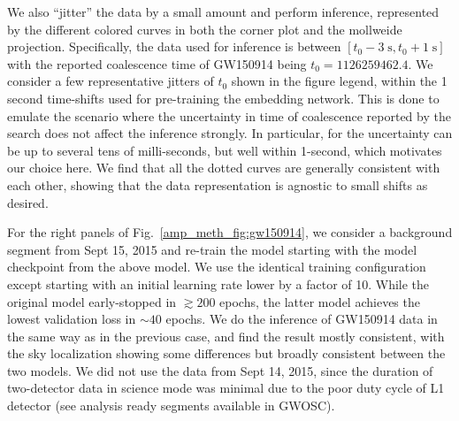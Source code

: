 \begin{refsection}
We also ``jitter'' the data by a small amount and perform inference, represented by the different colored curves in both the corner plot and the mollweide projection. 
Specifically, the data used for inference is between $[t_0 - 3\mathrm{\;s}, t_0 + 1\mathrm{\;s}]$ with the reported coalescence time of GW150914 being $t_0 = 1126259462.4$. 
We consider a few representative jitters of $t_0$ shown in the figure legend, within the 1 second time-shifts used for pre-training the embedding network.
This is done to emulate the scenario where the uncertainty in time of coalescence reported by the search does not affect the inference strongly. 
In particular, for {\aframe} the uncertainty can be up to several tens of milli-seconds, but well within 1-second, which motivates our choice here. 
We find that all the dotted curves are generally consistent with each other, showing that the data representation is agnostic to small shifts as desired.

For the right panels of Fig.~\ref{amp_meth_fig:gw150914}, we consider a background segment from Sept 15, 2015 and re-train the model starting with the model checkpoint from the above model.
We use the identical training configuration except starting with an initial learning rate lower by a factor of 10.
While the original model early-stopped in $\gtrsim 200$ epochs, the latter model achieves the lowest validation loss in $\sim 40$ epochs. 
We do the inference of GW150914 data in the same way as in the previous case, and find the result mostly consistent, with the sky localization showing some differences but broadly consistent between the two models. 
We did not use the data from Sept 14, 2015, since the duration of two-detector data in science mode was minimal due to the poor duty cycle of L1 detector (see analysis ready segments available in GWOSC).


\end{refsection}
